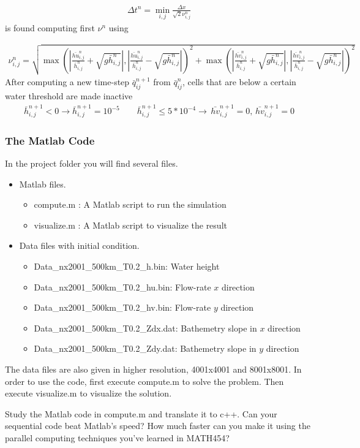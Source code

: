 \documentclass[10pt]{article}
\begin{document}
\begin{align*}
\Delta t^{n}=\min_{i,j}\frac{\Delta x}{\sqrt{2}\nu_{i,j}^{n}}
\end{align*}
is found computing first $\nu^{n}$ using

\begin{align*}
\nu_{i,j}^{n}=\sqrt{\max\left(\left|\frac{\bar{hu}_{i,j}^{n}}{\bar{h}_{i,j}^{n}}+\sqrt{g\bar{h}_{i,j}^{n}}\right|,\left|\frac{\bar{hu}_{i,j}^{n}}{\bar{h}_{i,j}^{n}}-\sqrt{g\bar{h}_{i,j}^{n}}\right|\right)^{2}+\max\left(\left|\frac{\bar{hv}_{i,j}^{n}}{\bar{h}_{i,j}^{n}}+\sqrt{g\bar{h}_{i,j}^{n}}\right|,\left|\frac{\bar{hv}_{i,j}^{n}}{\bar{h}_{i,j}^{n}}-\sqrt{g\bar{h}_{i,j}^{n}}\right|\right)^{2}}
\end{align*}
After computing a new time-step $\bar{q}_{ij}^{n+1}$ from $\bar{q}_{ij}^{n}$,
cells that are below a certain water threshold are made inactive
\begin{align*}
\bar{h}_{i,j}^{n+1}<0\rightarrow\bar{h}_{i,j}^{n+1}=10^{-5}\quad\quad\bar{h}_{i,j}^{n+1}\leq 5 * 10^{-4}\rightarrow\,\bar{hv}_{i,j}^{n+1}=0,\,\bar{hv}_{i,j}^{n+1}=0
\end{align*}


\subsubsection*{The Matlab Code}

In the project folder you will find several files. 
\begin{itemize}
\item Matlab files.
\begin{itemize}
\item compute.m : A Matlab script to run the simulation
\item visualize.m : A Matlab script to visualize the result 
\end{itemize}
\item Data files with initial condition.
\begin{itemize}
\item Data\_nx2001\_500km\_T0.2\_h.bin: Water height
\item Data\_nx2001\_500km\_T0.2\_hu.bin: Flow-rate $x$ direction
\item Data\_nx2001\_500km\_T0.2\_hv.bin: Flow-rate $y$ direction
\item Data\_nx2001\_500km\_T0.2\_Zdx.dat: Bathemetry slope in $x$ direction
\item Data\_nx2001\_500km\_T0.2\_Zdy.dat: Bathemetry slope in $y$ direction
\end{itemize}
\end{itemize}
%
The data files are also given in higher resolution, 4001x4001 and
8001x8001. In order to use the code, first execute compute.m to solve
the problem. Then execute visualize.m to visualize the solution. 

Study the Matlab code in compute.m and translate it to c++. Can your
sequential code beat Matlab's speed? How much faster can you make
it using the parallel computing techniques you've learned in MATH454?
\end{document}
